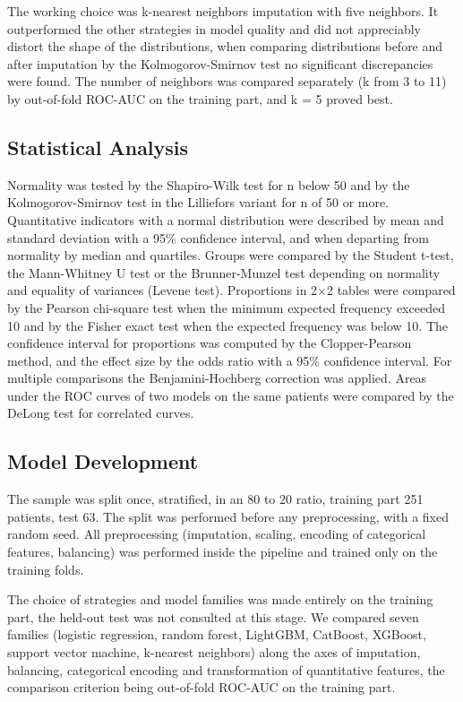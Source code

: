 \documentclass[pdflatex,sn-basic,Numbered]{sn-jnl}
\begin{document}
The working choice was k-nearest neighbors imputation with five neighbors. It outperformed the other strategies in model quality and did not appreciably distort the shape of the distributions, when comparing distributions before and after imputation by the Kolmogorov-Smirnov test no significant discrepancies were found. The number of neighbors was compared separately (k from 3 to 11) by out-of-fold ROC-AUC on the training part, and k = 5 proved best.

\subsection{Statistical Analysis}\label{subsec2_7}

Normality was tested by the Shapiro-Wilk test for n below 50 and by the Kolmogorov-Smirnov test in the Lilliefors variant for n of 50 or more. Quantitative indicators with a normal distribution were described by mean and standard deviation with a 95\% confidence interval, and when departing from normality by median and quartiles. Groups were compared by the Student t-test, the Mann-Whitney U test or the Brunner-Munzel test depending on normality and equality of variances (Levene test). Proportions in 2$\times$2 tables were compared by the Pearson chi-square test when the minimum expected frequency exceeded 10 and by the Fisher exact test when the expected frequency was below 10. The confidence interval for proportions was computed by the Clopper-Pearson method, and the effect size by the odds ratio with a 95\% confidence interval. For multiple comparisons the Benjamini-Hochberg correction was applied. Areas under the ROC curves of two models on the same patients were compared by the DeLong test for correlated curves.

\subsection{Model Development}\label{subsec2_8}

The sample was split once, stratified, in an 80 to 20 ratio, training part 251 patients, test 63. The split was performed before any preprocessing, with a fixed random seed. All preprocessing (imputation, scaling, encoding of categorical features, balancing) was performed inside the pipeline and trained only on the training folds.

The choice of strategies and model families was made entirely on the training part, the held-out test was not consulted at this stage. We compared seven families (logistic regression, random forest, LightGBM, CatBoost, XGBoost, support vector machine, k-nearest neighbors) along the axes of imputation, balancing, categorical encoding and transformation of quantitative features, the comparison criterion being out-of-fold ROC-AUC on the training part.
\end{document}
